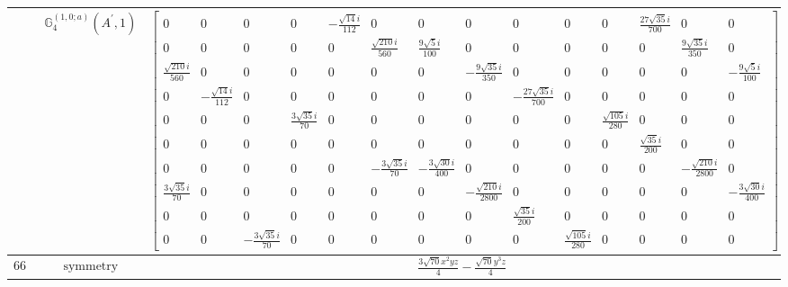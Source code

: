 \documentclass[fleqn,8pt,landscape]{jsarticle}
\begin{document}
\begin{longtable}{ccc}
$  $ & $ \mathbb{G}_{4}^{(1,0;a)}(A^{\prime},1) $ & $ \begin{bmatrix} 0 & 0 & 0 & 0 & - \frac{\sqrt{14} i}{112} & 0 & 0 & 0 & 0 & 0 & 0 & \frac{27 \sqrt{35} i}{700} & 0 & 0 \\ 0 & 0 & 0 & 0 & 0 & \frac{\sqrt{210} i}{560} & \frac{9 \sqrt{5} i}{100} & 0 & 0 & 0 & 0 & 0 & \frac{9 \sqrt{35} i}{350} & 0 \\ \frac{\sqrt{210} i}{560} & 0 & 0 & 0 & 0 & 0 & 0 & - \frac{9 \sqrt{35} i}{350} & 0 & 0 & 0 & 0 & 0 & - \frac{9 \sqrt{5} i}{100} \\ 0 & - \frac{\sqrt{14} i}{112} & 0 & 0 & 0 & 0 & 0 & 0 & - \frac{27 \sqrt{35} i}{700} & 0 & 0 & 0 & 0 & 0 \\ 0 & 0 & 0 & \frac{3 \sqrt{35} i}{70} & 0 & 0 & 0 & 0 & 0 & 0 & \frac{\sqrt{105} i}{280} & 0 & 0 & 0 \\ 0 & 0 & 0 & 0 & 0 & 0 & 0 & 0 & 0 & 0 & 0 & \frac{\sqrt{35} i}{200} & 0 & 0 \\ 0 & 0 & 0 & 0 & 0 & - \frac{3 \sqrt{35} i}{70} & - \frac{3 \sqrt{30} i}{400} & 0 & 0 & 0 & 0 & 0 & - \frac{\sqrt{210} i}{2800} & 0 \\ \frac{3 \sqrt{35} i}{70} & 0 & 0 & 0 & 0 & 0 & 0 & - \frac{\sqrt{210} i}{2800} & 0 & 0 & 0 & 0 & 0 & - \frac{3 \sqrt{30} i}{400} \\ 0 & 0 & 0 & 0 & 0 & 0 & 0 & 0 & \frac{\sqrt{35} i}{200} & 0 & 0 & 0 & 0 & 0 \\ 0 & 0 & - \frac{3 \sqrt{35} i}{70} & 0 & 0 & 0 & 0 & 0 & 0 & \frac{\sqrt{105} i}{280} & 0 & 0 & 0 & 0 \end{bmatrix} $ \\ \hline
$ 666 $ & $ \text{symmetry} $ & $ \frac{3 \sqrt{70} x^{2} y z}{4} - \frac{\sqrt{70} y^{3} z}{4} $ \\

\end{longtable}
\end{document}
